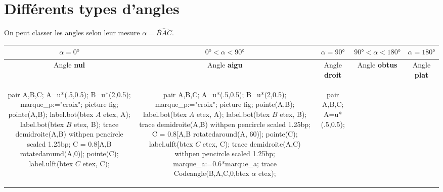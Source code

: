 \section{Différents types d'angles}

\begin{changemargin}{0mm}{-25mm}
\begin{definition}
    On peut classer les angles selon leur mesure $\alpha=\widehat{BAC}$.

    \smallskip
    {\renewcommand{\arraystretch}{1.5}
    \begin{tabular}{|*5{c|}}
        \hline
        $\alpha=\ang{0}$ & $\ang{0}<\alpha<\ang{90}$ & $\alpha=\ang{90}$ & $\ang{90}<\alpha<\ang{180}$ & $\alpha=\ang{180}$ \\\hline
        Angle \textbf{nul} & Angle \textbf{aigu} & Angle \textbf{droit} &  Angle \textbf{obtus} & Angle \textbf{plat} \\\hline
        \begin{Geometrie}[CoinHD={(2.5u,2.5u)}]            
            pair A,B,C;
            A=u*(.5,0.5);
            B=u*(2,0.5);
            marque_p:="croix";
            picture fig;
            pointe(A,B);
            label.bot(btex $A$ etex, A);
            label.bot(btex $B$ etex, B);
            trace demidroite(A,B) withpen pencircle scaled 1.25bp;
            C = 0.8[A,B rotatedaround(A,0)];
            pointe(C);
            label.ulft(btex $C$ etex, C);
        \end{Geometrie}
        &
        \begin{Geometrie}[CoinHD={(2.5u,2.5u)}]            
            pair A,B,C;
            A=u*(.5,0.5);
            B=u*(2,0.5);
            marque_p:="croix";
            picture fig;
            pointe(A,B);
            label.bot(btex $A$ etex, A);
            label.bot(btex $B$ etex, B);
            trace demidroite(A,B) withpen pencircle scaled 1.25bp;
            C = 0.8[A,B rotatedaround(A, 60)];
            pointe(C);
            label.ulft(btex $C$ etex, C);
            trace demidroite(A,C) withpen pencircle scaled 1.25bp;
            marque_a:=0.6*marque_a;
            trace Codeangle(B,A,C,0,btex $\alpha$ etex);
        \end{Geometrie}
        &
        \begin{Geometrie}[CoinHD={(2.5u,2.5u)}]            
            pair A,B,C;
            A=u*(.5,0.5);

\end{Geometrie}
\end{tabular}}
\end{definition}
\end{changemargin}
